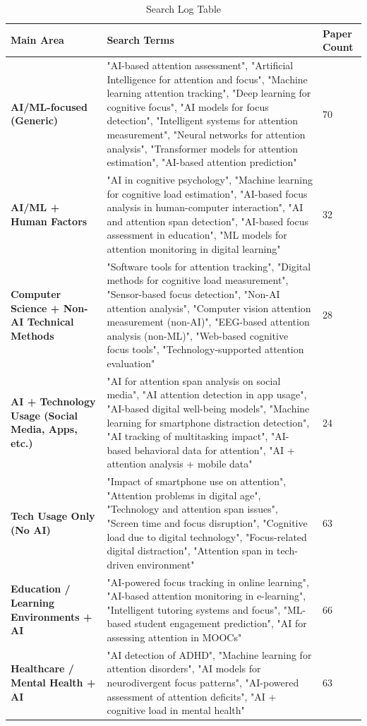 \documentclass[twocolumn,12pt]{article}
\begin{document}
\begin{table}[H]
\scriptsize                          %
\setlength{\tabcolsep}{4pt}         %
\renewcommand{\arraystretch}{0.5}   %
\caption{Search Log Table}
\begin{tabular}{|p{}|p{}|p{}|}
\hline
\textbf{Main Area} & \textbf{Search Terms} & \textbf{Paper Count} \\
\hline
\textbf{AI/ML-focused (Generic)} & "AI-based attention assessment", "Artificial Intelligence for attention and focus", "Machine learning attention tracking", "Deep learning for cognitive focus", "AI models for focus detection", "Intelligent systems for attention measurement", "Neural networks for attention analysis", "Transformer models for attention estimation", "AI-based attention prediction" & 70 \\
\hline
\textbf{AI/ML + Human Factors} & "AI in cognitive psychology", "Machine learning for cognitive load estimation", "AI-based focus analysis in human-computer interaction", "AI and attention span detection", "AI-based focus assessment in education", "ML models for attention monitoring in digital learning" & 32 \\
\hline
\textbf{Computer Science + Non-AI Technical Methods} & "Software tools for attention tracking", "Digital methods for cognitive load measurement", "Sensor-based focus detection", "Non-AI attention analysis", "Computer vision attention measurement (non-AI)", "EEG-based attention analysis (non-ML)", "Web-based cognitive focus tools", "Technology-supported attention evaluation" & 28 \\
\hline
\textbf{AI + Technology Usage (Social Media, Apps, etc.)} & "AI for attention span analysis on social media", "AI attention detection in app usage", "AI-based digital well-being models", "Machine learning for smartphone distraction detection", "AI tracking of multitasking impact", "AI-based behavioral data for attention", "AI + attention analysis + mobile data" & 24 \\
\hline
\textbf{Tech Usage Only (No AI)} & "Impact of smartphone use on attention", "Attention problems in digital age", "Technology and attention span issues", "Screen time and focus disruption", "Cognitive load due to digital technology", "Focus-related digital distraction", "Attention span in tech-driven environment" & 63 \\
\hline
\textbf{Education / Learning Environments + AI} & "AI-powered focus tracking in online learning", "AI-based attention monitoring in e-learning", "Intelligent tutoring systems and focus", "ML-based student engagement prediction", "AI for assessing attention in MOOCs" & 66 \\
\hline
\textbf{Healthcare / Mental Health + AI} & "AI detection of ADHD", "Machine learning for attention disorders", "AI models for neurodivergent focus patterns", "AI-powered assessment of attention deficits", "AI + cognitive load in mental health" & 63 \\
\hline
\end{tabular}
\end{table}
\end{document}

